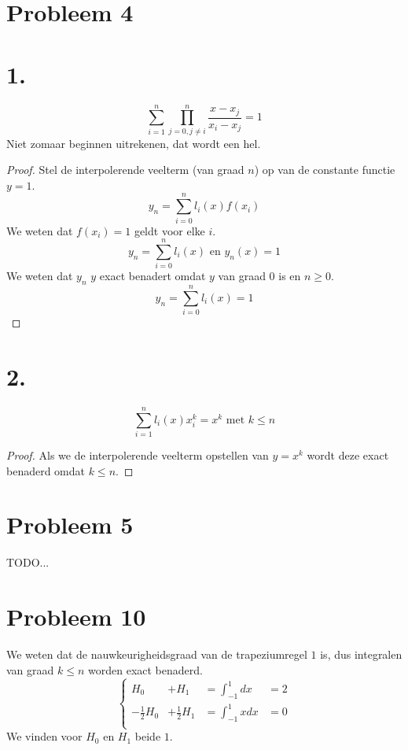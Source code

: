 \documentclass[12pt,a4paper]{article}
\begin{document}
\section{Probleem 4}
\section*{1.}
\[
\sum_{i=1}^{n}\prod_{j=0,j\neq i}^{n}\frac{x-x_j}{x_i-x_j}=1
\]
Niet zomaar beginnen uitrekenen, dat wordt een hel.
\begin{proof}
Stel de interpolerende veelterm (van graad $n$) op van de constante functie $y = 1$.
\[
y_n = \sum_{i=0}^{n}l_{i}(x)f(x_i)
\]
We weten dat $f(x_i) = 1$ geldt voor elke $i$.
\[
y_n = \sum_{i=0}^{n}l_{i}(x) \text{ en } y_n(x) = 1
\]
We weten dat $y_n$ $y$ exact benadert omdat $y$ van graad $0$ is en $n\ge 0$. 
\[
y_n = \sum_{i=0}^{n}l_{i}(x) = 1
\]
\end{proof}

\section*{2.}
\[
\sum_{i=1}^{n}l_i(x)x_{i}^{k}=x^{k} \text{ met } k \le n
\]
\begin{proof}
Als we de interpolerende veelterm opstellen van $y=x^k$ wordt deze exact benaderd omdat $k\le n$.
\end{proof}

\section{Probleem 5}
TODO...

\section{Probleem 10}
We weten dat de nauwkeurigheidsgraad van de trapeziumregel $1$ is, dus integralen van graad $k\le n$ worden exact benaderd.
\[
\left\{ 
\begin{array}{cccc}
H_0 &+ H_1 &= \int_{-1}^{1}dx &= 2\\
-\frac{1}{2}H_0 &+ \frac{1}{2}H_1 &= \int_{-1}^{1}xdx &= 0\\
\end{array}
\right.
\]
We vinden voor $H_0$ en $H_1$ beide $1$.
\end{document}
